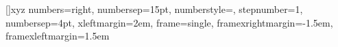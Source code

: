 	[]{xyz}
	{
		numbers=right,
		numbersep=15pt,
		numberstyle=\tiny,
		stepnumber=1,
		numbersep=4pt,
		xleftmargin=2em,
		frame=single,
		framexrightmargin=-1.5em,
		framexleftmargin=1.5em
	}



\newcommand{\nnt}{{\sf T}^{\geq 0}}             %
\newcommand{\post}{{\sf T}^{>0}}                %
\newcommand{\Variables}{{\sf V}}                %

\newcommand{\num}[1]{\relax\ifmmode \mathbb #1\else $\mathbb #1$\fi}
\newcommand{\nnnum}[1]{\relax\ifmmode 
	{\mathbb #1}_{\geq 0} \else ${\mathbb #1}_{\geq 0}$
	\fi}
\newcommand{\npnum}[1]{\relax\ifmmode 
	{\mathbb #1}_{\leq 0} \else ${\mathbb #1}_{\leq 0}$
	\fi}
\newcommand{\pnum}[1]{\relax\ifmmode 
	{\mathbb #1}_{> 0} \else ${\mathbb #1}_{> 0}$
	\fi}
\newcommand{\nnum}[1]{\relax\ifmmode 
	{\mathbb #1}_{< 0} \else ${\mathbb #1}_{< 0}$
	\fi}
\newcommand{\plnum}[1]{\relax\ifmmode 
	{\mathbb #1}_{+} \else ${\mathbb #1}_{+}$
	\fi}
\newcommand{\nenum}[1]{\relax\ifmmode 
	{\mathbb #1}_{-} \else ${\mathbb #1}_{-}$
	\fi}
\newcommand{\K}{$\mathbb{K}\ $}
\newcommand{\reals}{{\num R}}                    %
\newcommand{\booleans}{{\num B}}                    %
\newcommand{\nnreals}{{\nnnum R}}                    %
\newcommand{\realsinfty}{{\num R} \cup \{\infty, -\infty\}}                    %
\newcommand{\plreals}{{\plnum R}}                    %
\newcommand{\naturals}{{\num N}}                      %
\newcommand{\integers}{{\num Z}}                      %
\newcommand{\rationals}{{\num Q}}                      %
\newcommand{\nnrationals}{{\nnnum Q}}                   %
\newcommand{\Time}{{\num T}}  





\newcommand{\NA}[1]{\textcolor{SubtleColor}{ {\tiny \bf ($\star$)} #1}}
\newcommand{\TODO}[1]{\textcolor{TODOColor}{ {\tiny \bf TODO:} #1}}
\newcommand{\LATER}[1]{\textcolor{SubtleColor}{ {\tiny \bf ($\dagger$)} #1}}
\newcommand{\TBD}[1]{\textcolor{SubtleColor}{ {\tiny \bf (!)} #1}}
\newcommand{\PROBLEM}[1]{\textcolor{WowColor}{ {\bf (!!)} {\bf #1}}}
\newcommand{\ST}[1]{ \textcolor{SubtleColor}{ {\tiny \bf (!!)} \sout{#1} } }

